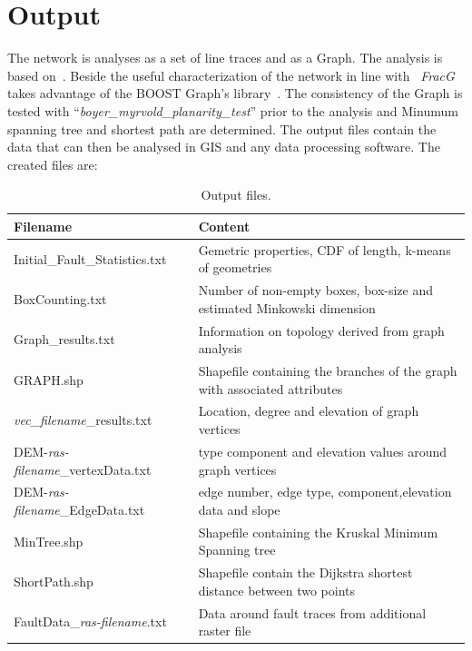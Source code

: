 \documentclass[10pt,a4paper]{article}
\begin{document}
\section{Output}
The network is analyses as a set of line traces and as a Graph. The  analysis is based on~\cite{san18}. 
Beside the useful characterization of the network in line with~\cite{san18} \textit{FracG} takes advantage of the BOOST Graph's library~\cite{sie02}. The consistency of the Graph is tested with ``\textit{boyer\_myrvold\_planarity\_test}'' prior to the analysis and Minumum spanning tree and shortest path are determined.
The output files contain the data that can then be analysed in GIS and any data processing software.
The created files are:
\begin{table}[h!]
  \begin{center}
    \caption{Output files.}
    \label{tab:table1}
    \begin{tabular}{l|l} %
      \textbf{Filename} & \textbf{Content} \\
      \hline
      Initial\_Fault\_Statistics.txt & Gemetric properties, CDF of length, k-means of geometries \\
      BoxCounting.txt & Number of non-empty boxes, box-size and estimated Minkowski dimension \\
      Graph\_results.txt &  Information on topology derived from graph analysis\\
      GRAPH.shp & Shapefile containing the branches of the graph with associated attributes  \\
      \textit{vec\_filename}\_results.txt & Location, degree and elevation of graph vertices \\
      DEM-\textit{ras-filename}\_vertexData.txt & type component and elevation values around graph vertices \\
      DEM-\textit{ras-filename}\_EdgeData.txt & edge number, edge type, component,elevation data and slope\\
      MinTree.shp & Shapefile containing the Kruskal Minimum Spanning tree \\
      ShortPath.shp & Shapefile contain the Dijkstra shortest distance between two points \\
      FaultData\_\textit{ras-filename}.txt & Data around fault traces from additional raster file \\
    \end{tabular}
  \end{center}
\end{table}

\vspace*{\fill}
 

\end{document}
